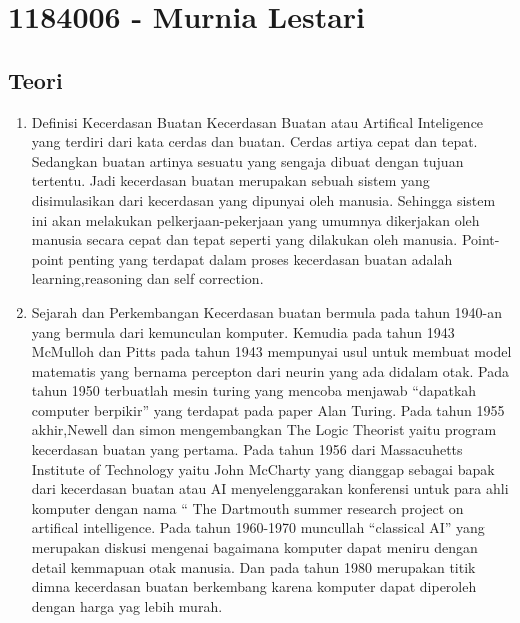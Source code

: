 \section{1184006 - Murnia Lestari}
\subsection{Teori}
\begin{enumerate}

	\item Definisi Kecerdasan Buatan
	\hfill\break
	Kecerdasan Buatan atau Artifical Inteligence yang terdiri dari kata cerdas dan buatan. Cerdas artiya cepat dan tepat.  Sedangkan buatan artinya sesuatu yang sengaja dibuat dengan tujuan tertentu. Jadi kecerdasan buatan merupakan sebuah sistem yang disimulasikan dari kecerdasan yang dipunyai oleh manusia. Sehingga sistem ini akan melakukan pelkerjaan-pekerjaan yang umumnya dikerjakan oleh manusia secara cepat dan tepat seperti yang dilakukan oleh manusia. Point-point penting yang terdapat  dalam proses kecerdasan buatan adalah learning,reasoning dan self correction.

	\item Sejarah dan Perkembangan
	\hfill\break
Kecerdasan buatan bermula pada tahun 1940-an yang bermula dari kemunculan komputer. Kemudia pada tahun 1943 McMulloh dan Pitts pada tahun 1943 mempunyai usul untuk membuat model matematis yang bernama percepton dari neurin yang ada didalam otak. Pada tahun 1950 terbuatlah mesin turing yang mencoba menjawab “dapatkah computer berpikir” yang terdapat pada paper Alan Turing. Pada tahun 1955 akhir,Newell dan simon mengembangkan The Logic Theorist yaitu program kecerdasan buatan yang pertama. Pada tahun 1956 dari Massacuhetts Institute of Technology yaitu John McCharty yang dianggap sebagai bapak dari kecerdasan buatan atau AI menyelenggarakan konferensi untuk para ahli komputer dengan nama “ The Dartmouth summer research project on artifical intelligence. Pada tahun 1960-1970 muncullah “classical AI” yang merupakan diskusi mengenai bagaimana komputer dapat meniru dengan detail kemmapuan otak manusia. Dan pada tahun 1980 merupakan titik dimna kecerdasan buatan berkembang karena komputer dapat diperoleh dengan harga yag lebih murah.
	


\end{enumerate}
